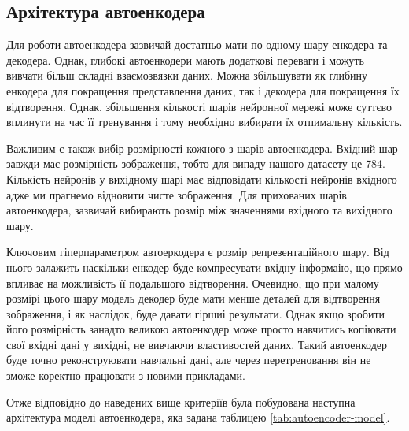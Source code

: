 \documentclass[14pt,a4paper]{extarticle}
\newcounter{e}
\numberwithin{equation}{section}
\numberwithin{figure}{section}
\begin{document}
	\subsection{Архітектура автоенкодера}	

	Для роботи автоенкодера зазвичай достатньо мати по одному шару енкодера та декодера. Однак, глибокі автоенкодери мають додаткові переваги і можуть вивчати більш складні взаємозвязки даних. Можна збільшувати як глибину енкодера для покращення представлення даних, так і декодера для покращення їх відтворення. Однак, збільшення кількості шарів нейронної мережі може суттєво вплинути на час її тренування і тому необхідно вибирати їх отпимальну кількість.
		
	Важливим є також вибір розмірності кожного з шарів автоенкодера. Вхідний шар завжди має розмірність зображення, тобто для випаду нашого датасету це 784. Кількість нейронів у вихідному шарі має відповідати кількості нейронів вхідного адже ми прагнемо відновити чисте зображення. Для прихованих шарів автоенкодера, зазвичай вибирають розмір між значеннями вхідного та вихідного шару. 
	
	Ключовим гіперпараметром автоеркодера є розмір репрезентаційного шару. Від нього залажить наскільки енкодер буде компресувати вхідну інформаію, що прямо впливає на можливість її подальшого відтворення. Очевидно, що при малому розмірі цього шару модель декодер буде мати менше деталей для відтворення зображення, і як наслідок, буде давати гіршиі результати.  Однак якщо зробити його розмірність занадто великою автоенкодер може просто навчитись копіювати свої вхідні дані у вихідні, не вивчаючи властивостей даних. Такий автоенкодер буде точно реконструювати навчальні дані, але через перетреновання він не зможе коректно працювати з новими прикладами.
	
	Отже відповідно до наведених вище критеріїв була побудована наступна архітектура моделі автоенкодера, яка задана таблицею \ref{tab:autoencoder-model}.
	
\end{document}
